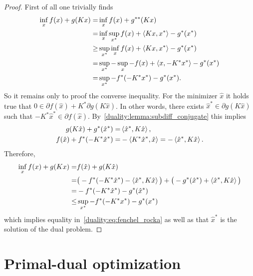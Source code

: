 \begin{proof}
    First of all one trivially finds
    \begin{equation}\label{duality:eq:fenchel_rocka}
        \begin{aligned}
            \inf_{x} f(x) + g(Kx)
            =& \inf_{x} f(x) + g^{**}(Kx)\\
            =& \inf_{x}\sup_{x^*} f(x) + \left\langle Kx , x^*\right\rangle - g^*(x^*)\\
            \geq & \sup_{x^*} \inf_{x} f(x) + \left\langle Kx , x^*\right\rangle - g^*(x^*)\\
            = & \sup_{x^*} -\sup_{x} -f(x) + \left\langle x , -K^*x^*\right\rangle - g^*(x^*)\\
            = & \sup_{x^*} -f^*(-K^*x^*) - g^*(x^*).
        \end{aligned}
    \end{equation}
    So it remains only to proof the converse inequality.
    For the minimizer $\hat x$ it holds true that $0 \in \partial f(\hat x) + K^*\partial g(K\hat x)$. In other words, there exists $\hat x^*\in \partial g(K\hat x)$ such that $-K^*\hat x^*\in \partial f (\hat x)$. By~\cref{duality:lemma:subdiff_conjugate} this implies
    \begin{equation}
        \begin{aligned}
            g(K\hat x) + g^*(\hat x^*) =& \left\langle\hat x^* , K\hat x\right\rangle,\\
            f(\hat x) + f^*(-K^*\hat x^*) 
            =& -\left\langle K^*\hat x^* , \hat x\right\rangle = -\left\langle\hat x^* , K\hat x\right\rangle.
        \end{aligned}
    \end{equation}
    Therefore, 
    \begin{equation}
        \begin{aligned}
            \inf_x f(x) + g(Kx) 
            =& f(\hat x) + g(K\hat x) \\
            =& \big(-f^*(-K^*\hat x^*) - \left\langle\hat x^* , K\hat x\right\rangle\big) + \big(-g^*(\hat x^*) + \left\langle\hat x^* , K\hat x\right\rangle\big)\\
            =& -f^*(-K^*\hat x^*) -g^*(\hat x^*)\\
            \leq& \sup_{x^*} -f^*(-K^*x^*) - g^*(x^*)
        \end{aligned}
    \end{equation}
    which implies equality in~\eqref{duality:eq:fenchel_rocka} as well as that $\hat x^*$ is the solution of the dual problem.
\end{proof}

\section{Primal-dual optimization}

